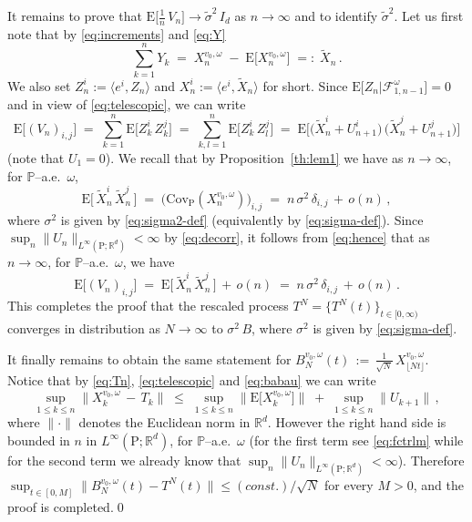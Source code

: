 \documentclass[a4paper,reqno,11pt]{amsart}
\numberwithin{equation}{section}
\newcommand{\bbP}{{\ensuremath{\mathbb P}} }
\newcommand{\cF}{{\ensuremath{\mathcal F}} }
\newcommand{\gd}{\delta}
\newcommand{\gs}{\sigma}
\newcommand{\go}{\omega}
\renewcommand{\tilde}{\widetilde}          %
\newcommand{\R}{\mathbb{R}}
\def\bP{\ensuremath{\bs{\mathrm{P}}}}
\def\bE{\ensuremath{\bs{\mathrm{E}}}}
\def\bs{\boldsymbol}
\begin{document}
It remains to prove that $\bE \big[ \frac 1n \, V_n \big] \to \tilde\gs^2 \, I_d$
as $n\to\infty$ and to identify $\tilde\gs^2$.
Let us first note that by \eqref{eq:increments} and \eqref{eq:Y}
\begin{equation} \label{eq:babau}
	\sum_{k=1}^n Y_k \;=\; X_n^{v_0, \go} \;-\; \bE \big[ X_n^{v_0, \go} \big]
	\;=:\; \widetilde X_n
	\,.
\end{equation}
We also set $Z_n^i := \langle e^i, Z_n \rangle$ and
$X_n^i := \langle e^i, \widetilde X_n \rangle$ for short.
Since $\bE \big[ Z_n \big| \cF^\go_{1,n-1} \big] = 0$
and in view of \eqref{eq:telescopic}, we can write
\begin{equation} \label{eq:hence}
	\bE \big[ (V_n)_{i,j} \big] \;=\; \sum_{k=1}^n
	\bE \big[ Z_k^i \, Z_k^j \big] \;=\; \sum_{k,l=1}^n
	\bE \big[ Z_k^i \, Z_l^j \big] \;=\;
	\bE \big[ \big(\tilde X_n^i + U_{n+1}^i\big)\, \big(\tilde X_n^j + U_{n+1}^j \big) \big]
\end{equation}
(note that $U_1 = 0$). We recall that by Proposition~\ref{th:lem1} we have as $n \to \infty$,
for $\bbP$--a.e.~$\go$,
\begin{equation}
	\bE \big[\, \tilde X_n^i \, \tilde X_n^j \, \big] \;=\;
	\big( \text{Cov}_{\bP}( X_n^{v_0, \go}) \big)_{i,j} \;=\; n \, \gs^2 \, \gd_{i,j}
	\,+\, o(n) \,,
\end{equation}
where $\gs^2$ is given by \eqref{eq:sigma2-def} (equivalently by \eqref{eq:sigma-def}).
Since $\sup_n \|U_n\|_{L^\infty(\bP;\R^d)}<\infty$ by \eqref{eq:decorr},
it follows from \eqref{eq:hence} that as $n \to \infty$, for $\bbP$--a.e.~$\go$, we have
\begin{equation}
	\bE \big[ (V_n)_{i,j} \big] \;=\; \bE \big[\, \tilde X_n^i \, \tilde X_n^j \, \big]
	\,+\, o(n) \;=\; n \, \gs^2 \, \gd_{i,j} \,+\, o(n) \,.
\end{equation}
This completes the proof that the rescaled process $T^N = \{T^N(t)\}_{t \in [0,\infty)}$
converges in distribution as $N \to \infty$ to $\gs^2 \, B$, where
$\gs^2$ is given by \eqref{eq:sigma-def}.

It finally remains to obtain the same statement for
$B^{v_0, \go}_{N}(t) \,:=\, \frac{1}{\sqrt N} \, X^{v_0, \omega}_{ \lfloor Nt\rfloor}$.
Notice that by \eqref{eq:Tn}, \eqref{eq:telescopic} and \eqref{eq:babau} we can write
\begin{equation}
	\sup_{1 \le k \le n} \big\| X^{v_0, \omega}_k \,-\, T_k \big\| \;\le\;
	\sup_{1 \le k \le n} \big\| \bE \big[ X^{v_0, \omega}_k \big] \big\| \;+\;
	\sup_{1 \le k \le n} \big\| U_{k+1} \big\| \,,
\end{equation}
where $\|\cdot\|$ denotes the Euclidean norm in $\R^d$.
However the right hand side is bounded in $n$ in $L^\infty(\bP;\R^d)$,
for $\bbP$--a.e.~$\go$  (for the first term
see \eqref{eq:fctrlm} while for the second term
we already know that $\sup_n \|U_n\|_{L^\infty(\bP;\R^d)}<\infty$).
Therefore $\sup_{t \in [0,M]} \| B^{v_0, \go}_{N}(t) - T^N(t) \|
\le (const.)/\sqrt{N}$ for every $M > 0$, and the proof is completed.\qed
\end{document}
